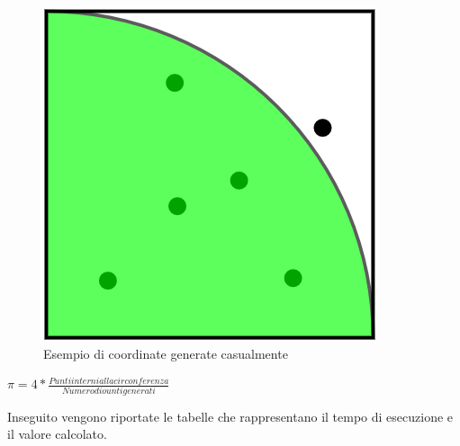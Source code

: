 \documentclass[12pt,a4paper]{report}
\begin{document}
\begin{figure}[ht]
\centering
\includegraphics[scale=0.3]{Img/qCirc.png}
\caption{Esempio di coordinate generate casualmente}
\end{figure}

\begin{center}
$ \pi = 4 * \frac{Punti interni alla circonferenza}{Numero di ounti generati} $ 
\end{center}


	

Inseguito vengono riportate le tabelle che rappresentano il tempo di esecuzione e il valore calcolato.
\end{document}
